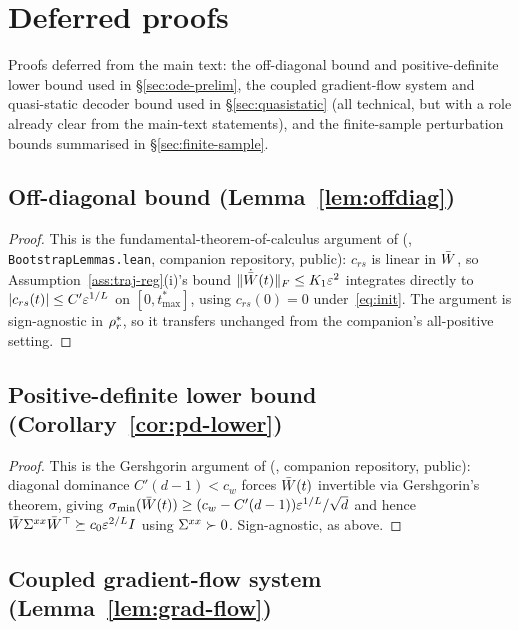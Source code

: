 \section{Deferred proofs}
\label{app:finite-sample-derivation}

Proofs deferred from the main text: the off-diagonal bound and positive-definite lower
bound used in \S\ref{sec:ode-prelim}, the coupled gradient-flow system and quasi-static
decoder bound used in \S\ref{sec:quasistatic} (all technical, but with a role already
clear from the main-text statements), and the finite-sample perturbation bounds
summarised in \S\ref{sec:finite-sample}.

\subsection{Off-diagonal bound (Lemma~\ref{lem:offdiag})}
\label{ssec:offdiag-proof}

\begin{proof}
This is the fundamental-theorem-of-calculus argument of
\citet[\S6, Prop.~(Bootstrap consistency), item~1]{Goh2026ordering}
(, \texttt{BootstrapLemmas.lean}, companion repository,
public): $c_{rs}$ is linear in $\bar{W}$, so
Assumption~\ref{ass:traj-reg}(i)'s bound $\|\dot{\bar{W}}(t)\|_F \le K_1\varepsilon^2$
integrates directly to $|c_{rs}(t)| \le C'\varepsilon^{1/L}$ on $[0,t_{\max}^*]$,
using $c_{rs}(0)=0$ under~\eqref{eq:init}. The argument is sign-agnostic
in $\rho_r^*$, so it transfers unchanged from the companion's all-positive
setting.
\end{proof}

\subsection{Positive-definite lower bound (Corollary~\ref{cor:pd-lower})}
\label{ssec:pd-lower-proof}

\begin{proof}
This is the Gershgorin argument of \citet[\S6, Prop.~(Bootstrap
consistency), item~2]{Goh2026ordering} (,
companion repository, public): diagonal dominance $C'(d-1)<c_w$ forces
$\bar{W}(t)$ invertible via Gershgorin's theorem, giving
$\sigma_{\min}(\bar{W}(t)) \ge (c_w-C'(d-1))\varepsilon^{1/L}/\sqrt d$ and hence
$\bar{W}\Sigma^{xx}\bar{W}^\top \succeq c_0\varepsilon^{2/L}I$ using $\Sigma^{xx}\succ0$.
Sign-agnostic, as above.
\end{proof}

\subsection{Coupled gradient-flow system (Lemma~\ref{lem:grad-flow})}
\label{ssec:grad-flow-proof}

